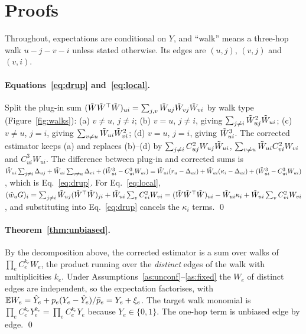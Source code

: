 \section{Proofs}\label{app:proofs}

Throughout, expectations are conditional on $Y$, and ``walk'' means a
three-hop walk $u\!-\!j\!-\!v\!-\!i$ unless stated otherwise. Its edges are
$(u,j)$, $(v,j)$ and $(v,i)$.

\paragraph{Equations~\eqref{eq:drup} and~\eqref{eq:local}.}
Split the plug-in sum $(\tilde W\tilde W^\top\tilde W)_{ui}=\sum_{j,v}\tilde W_{uj}\tilde W_{vj}\tilde W_{vi}$ by walk
type (Figure~\ref{fig:walks}): (a) $v\ne u$, $j\ne i$; (b) $v=u$, $j\ne i$, giving
$\sum_{j\ne i}\tilde W_{uj}^2\tilde W_{ui}$; (c) $v\ne u$, $j=i$, giving
$\sum_{v\ne u}\tilde W_{ui}\tilde W_{vi}^2$; (d) $v=u$, $j=i$, giving $\tilde W_{ui}^3$. The
corrected estimator keeps (a) and replaces (b)--(d) by
$\sum_{j\ne i}C_{uj}^2W_{uj}\tilde W_{ui}$, $\sum_{v\ne u}\tilde W_{ui}C_{vi}^2W_{vi}$ and
$C_{ui}^3W_{ui}$. The difference between plug-in and corrected sums is
$\tilde W_{ui}\sum_{j\ne i}\Delta_{uj}+\tilde W_{ui}\sum_{v\ne u}\Delta_{vi}+(\tilde W_{ui}^3-C_{ui}^3W_{ui})
=\tilde W_{ui}(r_u-\Delta_{ui})+\tilde W_{ui}(\kappa_i-\Delta_{ui})+(\tilde W_{ui}^3-C_{ui}^3W_{ui})$,
which is Eq.~\eqref{eq:drup}. For Eq.~\eqref{eq:local},
$(\tilde w_uG)_i=\sum_{j\ne i}\tilde W_{uj}(\tilde W^\top\tilde W)_{ji}+\tilde W_{ui}\sum_vC_{vi}^2W_{vi}
=(\tilde W\tilde W^\top\tilde W)_{ui}-\tilde W_{ui}\kappa_i+\tilde W_{ui}\sum_vC_{vi}^2W_{vi}$, and substituting
into Eq.~\eqref{eq:drup} cancels the $\kappa_i$ terms. \qed

\paragraph{Theorem~\ref{thm:unbiased}.}
By the decomposition above, the corrected estimator is a sum over walks of
$\prod_{e}C_e^{k_e}W_e$, the product running over the \emph{distinct} edges of the
walk with multiplicities $k_e$. Under Assumptions~\ref{as:unconf}--\ref{as:fixed}
the $W_e$ of distinct edges are independent, so the expectation factorises,
with $\mathbb{E} W_e=\hat Y_e+p_e(Y_e-\hat Y_e)/\bar p_e=Y_e+\xi_e$. The target walk
monomial is $\prod_eC_e^{k_e}Y_e^{k_e}=\prod_eC_e^{k_e}Y_e$ because
$Y_e\in\{0,1\}$. The one-hop term is unbiased edge by edge. \qed

